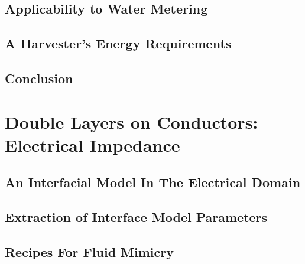   \chapter{Applicability to Water Metering}
    \label{chap:part1_waterMetering}
    

  \chapter{A Harvester's Energy Requirements}
    \label{chap:part1_energyHarvestingRequirements}
    

  \chapter{Conclusion}
    \label{chap:part1_conclusion}
    



\part{Double Layers on Conductors: Electrical Impedance}
  \label{part:doubleLayersOnConductors}


  \chapter{An Interfacial Model In The Electrical Domain}
    \label{chap:theInterfaceModel}
    

  \chapter{Extraction of Interface Model Parameters}
    \label{chap:modellingSaline}
    

  \chapter{Recipes For Fluid Mimicry}
    \label{chap:fluid_mimicry}
    

